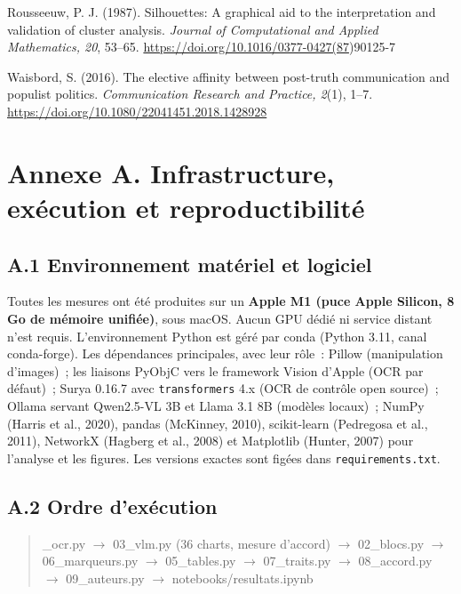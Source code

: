 \documentclass[11pt,a4paper]{article}
\begin{document}
Rousseeuw, P. J. (1987). Silhouettes: A graphical aid to the interpretation and validation of cluster analysis. \emph{Journal of Computational and Applied Mathematics, 20}, 53--65. \url{https://doi.org/10.1016/0377-0427(87})90125-7

Waisbord, S. (2016). The elective affinity between post-truth communication and populist politics. \emph{Communication Research and Practice, 2}(1), 1--7. \url{https://doi.org/10.1080/22041451.2018.1428928}



\section*{Annexe A. Infrastructure, exécution et reproductibilité}

\subsection*{A.1 Environnement matériel et logiciel}

Toutes les mesures ont été produites sur un \textbf{Apple M1 (puce Apple Silicon, 8 Go de mémoire unifiée)}, sous macOS. Aucun GPU dédié ni service distant n'est requis. L'environnement Python est géré par conda (Python 3.11, canal conda-forge). Les dépendances principales, avec leur rôle~: Pillow (manipulation d'images)~; les liaisons PyObjC vers le framework Vision d'Apple (OCR par défaut)~; Surya 0.16.7 avec \texttt{transformers} 4.x (OCR de contrôle open source)~; Ollama servant Qwen2.5-VL 3B et Llama 3.1 8B (modèles locaux)~; NumPy (Harris et al., 2020), pandas (McKinney, 2010), scikit-learn (Pedregosa et al., 2011), NetworkX (Hagberg et al., 2008) et Matplotlib (Hunter, 2007) pour l'analyse et les figures. Les versions exactes sont figées dans \texttt{requirements.txt}.

\subsection*{A.2 Ordre d'exécution}

\begin{quote}\ttfamily\small{}\_ocr.py  $\rightarrow$  03\_vlm.py (36 charts, mesure d'accord)  $\rightarrow$  02\_blocs.py
   $\rightarrow$  06\_marqueurs.py  $\rightarrow$  05\_tables.py  $\rightarrow$  07\_traits.py
   $\rightarrow$  08\_accord.py  $\rightarrow$  09\_auteurs.py  $\rightarrow$  notebooks/resultats.ipynb
\end{quote}
\end{document}
